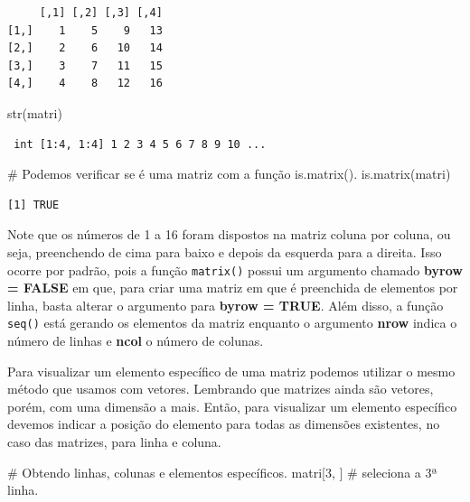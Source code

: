 \documentclass[
  letterpaper,
  DIV=11,
  numbers=noendperiod]{scrreprt}
\newenvironment{Shaded}{\begin{snugshade}}{\end{snugshade}}
\newcommand{\CommentTok}[1]{\textcolor[rgb]{0.37,0.37,0.37}{#1}}
\newcommand{\DecValTok}[1]{\textcolor[rgb]{0.68,0.00,0.00}{#1}}
\newcommand{\FunctionTok}[1]{\textcolor[rgb]{0.28,0.35,0.67}{#1}}
\newcommand{\NormalTok}[1]{\textcolor[rgb]{0.00,0.23,0.31}{#1}}
\begin{document}
\begin{verbatim}
     [,1] [,2] [,3] [,4]
[1,]    1    5    9   13
[2,]    2    6   10   14
[3,]    3    7   11   15
[4,]    4    8   12   16
\end{verbatim}

\begin{Shaded}
\begin{Highlighting}[]
\FunctionTok{str}\NormalTok{(matri)}
\end{Highlighting}
\end{Shaded}

\begin{verbatim}
 int [1:4, 1:4] 1 2 3 4 5 6 7 8 9 10 ...
\end{verbatim}

\begin{Shaded}
\begin{Highlighting}[]
\CommentTok{\# Podemos verificar se é uma matriz com a função is.matrix().}
\FunctionTok{is.matrix}\NormalTok{(matri)}
\end{Highlighting}
\end{Shaded}

\begin{verbatim}
[1] TRUE
\end{verbatim}

Note que os números de 1 a 16 foram dispostos na matriz coluna por
coluna, ou seja, preenchendo de cima para baixo e depois da esquerda
para a direita. Isso ocorre por padrão, pois a função \texttt{matrix()}
possui um argumento chamado \textbf{byrow = FALSE} em que, para criar
uma matriz em que é preenchida de elementos por linha, basta alterar o
argumento para \textbf{byrow = TRUE}. Além disso, a função
\texttt{seq()} está gerando os elementos da matriz enquanto o argumento
\textbf{nrow} indica o número de linhas e \textbf{ncol} o número de
colunas.

Para visualizar um elemento específico de uma matriz podemos utilizar o
mesmo método que usamos com vetores. Lembrando que matrizes ainda são
vetores, porém, com uma dimensão a mais. Então, para visualizar um
elemento específico devemos indicar a posição do elemento para todas as
dimensões existentes, no caso das matrizes, para linha e coluna.

\begin{Shaded}
\begin{Highlighting}[]
\CommentTok{\# Obtendo linhas, colunas e elementos específicos.}
\NormalTok{matri[}\DecValTok{3}\NormalTok{,  ]   }\CommentTok{\# seleciona a 3ª linha.}
\end{Highlighting}
\end{Shaded}
\end{document}
